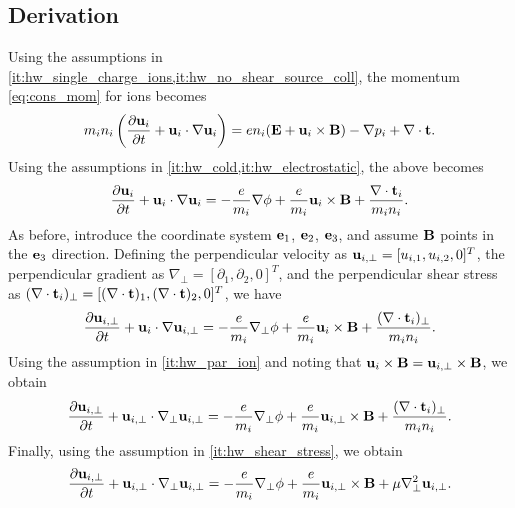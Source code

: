 \documentclass[oneside,a4paper,11pt]{report}
\begin{document}
\subsection{Derivation}
Using the assumptions in \cref{it:hw_single_charge_ions,it:hw_no_shear_source_coll}, the momentum \cref{eq:cons_mom} for ions becomes
\begin{equation}
    m_i n_i \left (\frac{\partial \mathbf{u}_i}{\partial t} + \mathbf{u}_i \cdot \nabla \mathbf{u}_i \right ) = e n_i (\mathbf{E} + \mathbf{u}_i \times \mathbf{B}) - \nabla p_i + \nabla \cdot \mathbf{t}.
\end{equation}
Using the assumptions in \cref{it:hw_cold,it:hw_electrostatic}, the above becomes
\begin{equation}
    \frac{\partial \mathbf{u}_i}{\partial t} + \mathbf{u}_i \cdot \nabla \mathbf{u}_i = -\frac{e}{m_i} \nabla \phi + \frac{e}{m_i}\mathbf{u}_i \times \mathbf{B} + \frac{\nabla \cdot \mathbf{t}_i}{m_i n_i}.
\end{equation}
As before, introduce the coordinate system $\mathbf{e}_1$, $\mathbf{e}_2$, $\mathbf{e}_3$, and assume $\mathbf{B}$ points in the $\mathbf{e}_3$ direction. Defining the perpendicular velocity as $\mathbf{u}_{i,\perp} = [u_{i,1}, u_{i,2}, 0]^T$, the perpendicular gradient as $\nabla_\perp = [\partial_1, \partial_2, 0]^T$, and the perpendicular shear stress as $(\nabla \cdot \mathbf{t}_i)_\perp = [(\nabla \cdot \mathbf{t})_1, (\nabla \cdot \mathbf{t})_2, 0]^T$, we have
\begin{equation}
    \frac{\partial \mathbf{u}_{i,\perp}}{\partial t} + \mathbf{u}_i \cdot \nabla \mathbf{u}_{i,\perp} = -\frac{e}{m_i} \nabla_\perp \phi + \frac{e}{m_i}\mathbf{u}_i \times \mathbf{B} + \frac{(\nabla \cdot \mathbf{t}_i)_\perp}{m_i n_i}.
\end{equation}
Using the assumption in \cref{it:hw_par_ion} and noting that $\mathbf{u}_{i} \times \mathbf{B} = \mathbf{u}_{i,\perp} \times \mathbf{B}$, we obtain
\begin{equation}
    \frac{\partial \mathbf{u}_{i,\perp}}{\partial t} + \mathbf{u}_{i,\perp} \cdot \nabla_\perp \mathbf{u}_{i,\perp} = -\frac{e}{m_i} \nabla_\perp \phi + \frac{e}{m_i} \mathbf{u}_{i,\perp} \times \mathbf{B} + \frac{(\nabla \cdot \mathbf{t}_i)_\perp}{m_i n_i}.
\end{equation}
Finally, using the assumption in \cref{it:hw_shear_stress}, we obtain
\begin{equation}
    \label{eq:hw_momentum_perpendicular}
        \frac{\partial \mathbf{u}_{i,\perp}}{\partial t} + \mathbf{u}_{i,\perp} \cdot \nabla_\perp \mathbf{u}_{i,\perp} = -\frac{e}{m_i} \nabla_\perp \phi + \frac{e}{m_i} \mathbf{u}_{i,\perp} \times \mathbf{B} + \mu \nabla_\perp^2 \mathbf{u}_{i,\perp}.
\end{equation}
\end{document}
